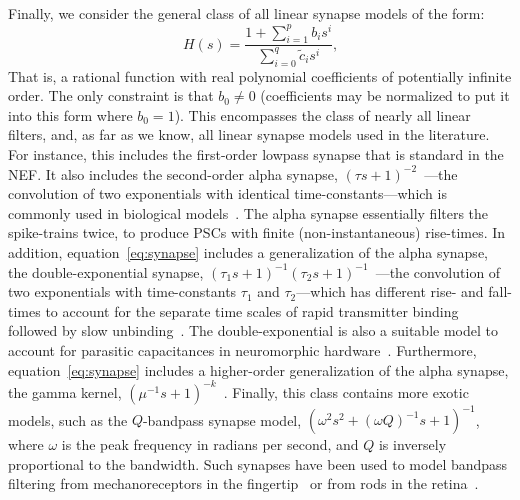 Finally, we consider the general class of all linear synapse models of the form:
\begin{equation} \label{eq:synapse}
H(s) = \frac{1 + \sum_{i=1}^p b_i s^i}{\sum_{i=0}^q \tilde{c}_i s^i} \text{,}
\end{equation}
That is, a rational function with real polynomial coefficients of potentially infinite order.
The only constraint is that $b_0 \ne 0$ (coefficients may be normalized to put it into this form where $b_0 = 1$).
This encompasses the class of nearly all linear filters, and, as far as we know, all linear synapse models used in the literature.
For instance, this includes the first-order lowpass synapse that is standard in the NEF.
It also includes the second-order alpha synapse, $(\tau s + 1)^{-2}$~\citep{rall1967distinguishing}---the convolution of two exponentials with identical time-constants---which is commonly used in biological models~\citep{destexhe1994synthesis, mainen1995reliability, koch1998methods, destexhe1998kinetic, roth2009modeling}.
The alpha synapse essentially filters the spike-trains twice, to produce PSCs with finite (non-instantaneous) rise-times.
In addition, equation~\ref{eq:synapse} includes a generalization of the alpha synapse, the double-exponential synapse, $(\tau_1 s + 1)^{-1}(\tau_2 s + 1)^{-1}$~\citep{wilson1989simulation}---the convolution of two exponentials with time-constants $\tau_1$ and $\tau_2$---which has different rise- and fall-times to account for the separate time scales of rapid transmitter binding followed by slow unbinding~\citep{destexhe1994synthesis, hausser1997estimating, roth2009modeling}.
The double-exponential is also a suitable model to account for parasitic capacitances in neuromorphic hardware~\citep{voelker2017iscas}.
Furthermore, equation~\ref{eq:synapse} includes a higher-order generalization of the alpha synapse, the gamma kernel, $(\mu^{-1} s + 1)^{-k}$~\citep[][equation 19]{de1992gamma}. 
Finally, this class contains more exotic models, such as the $Q$-bandpass synapse model, $({\omega^2}s^2 + (\omega Q)^{-1}s + 1)^{-1}$, where $\omega$ is the peak frequency in radians per second, and $Q$ is inversely proportional to the bandwidth.
Such synapses have been used to model bandpass filtering from mechanoreceptors in the fingertip~\citep{voelker2016a} or from rods in the retina~\citep{armstrong2003bandpass}.

